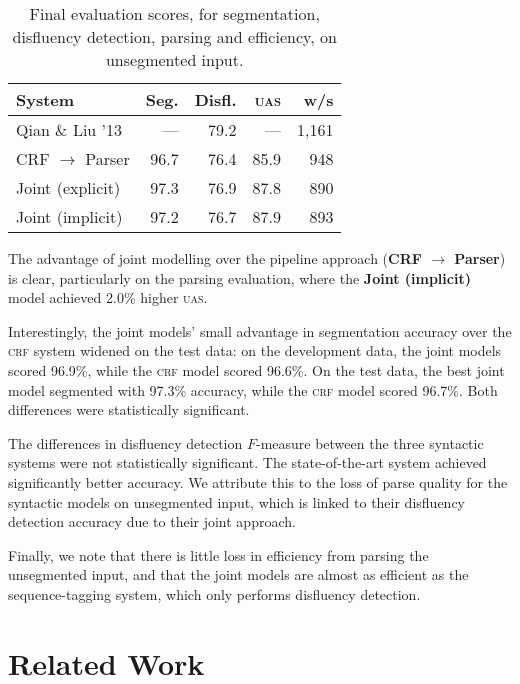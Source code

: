 \documentclass[11pt,letterpaper]{article}
\begin{document}
\begin{table}
    \centering
    \small
    \begin{tabular}{l|rrrr}
        \hline
        System & Seg. & Disfl. & \textsc{uas} & w/s \\
        \hline \hline
        Qian \& Liu '13          & ---  & 79.2 & ---  & 1,161 \\
        CRF $\rightarrow$ Parser & 96.7 & 76.4 & 85.9 & 948   \\
        Joint (explicit)         & 97.3 & 76.9 & 87.8 & 890   \\
        Joint (implicit)         & 97.2 & 76.7 & 87.9 & 893   \\
        \hline
    \end{tabular}
    \caption{\small Final evaluation scores, for segmentation, disfluency detection,
    parsing and efficiency, on unsegmented input.\label{tab:test}}
    \vspace*{-4em}
\end{table}



The advantage of joint modelling over the pipeline approach
(\textbf{CRF $\rightarrow$ Parser}) is clear, particularly
on the parsing evaluation, where the \textbf{Joint (implicit)} model achieved
2.0\% higher \textsc{uas}.

Interestingly, the joint models' small advantage in segmentation
accuracy over the \textsc{crf} system widened on the test data: on the development
data, the joint models scored 96.9\%, while the \textsc{crf} model scored 96.6\%.
On the test data, the best joint model segmented with 97.3\% accuracy, while the
\textsc{crf} model scored 96.7\%.  Both differences were statistically significant.

The differences in disfluency detection $F$-measure between the three syntactic
systems were not statistically significant.  The state-of-the-art \citet{qian:13}
system achieved significantly better accuracy.  We attribute this to the loss
of parse quality for the syntactic models on unsegmented input, which is linked
to their disfluency detection accuracy due to their joint approach.

Finally, we note that there is little loss in efficiency from parsing the unsegmented
input, and that the joint models are almost as efficient as the \citet{qian:13}
sequence-tagging system, which only performs disfluency detection.

\section{Related Work}
\end{document}
